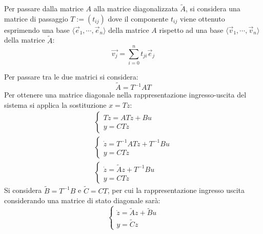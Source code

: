 \documentclass{article}
\numberwithin{equation}{subsection}
\begin{document}
Per passare dalla matrice $A$ alla matrice diagonalizzata $\tilde A$, si considera una matrice di passaggio $T:=(t_{ij})$ dove il componente $t_{ij}$ viene ottenuto esprimendo 
una base $\langle\vec{e}_1,\cdots,\vec{e}_n\rangle$ della matrice $A$ rispetto ad una base $\langle\vec{v}_1,\cdots,\vec{v}_n\rangle$ della matrice $\tilde A$:
\begin{equation}
    \vec{v_j}=\displaystyle\sum_{i=0}^{n}t_{ji}\vec{e}_j
\end{equation}

Per passare tra le due matrici si considera:
\begin{equation}
    \tilde A=T^{-1}AT
\end{equation}
Per ottenere una matrice diagonale nella rappresentazione ingresso-uscita del sistema si applica la sostituzione $x=Tz$:
\begin{gather}
    \begin{cases}
        T\dot z=ATz+Bu\\
        y=CTz
    \end{cases}\\
    \begin{cases}
        \dot z=T^{-1}ATz+T^{-1}Bu\\
        y=CTz
    \end{cases}\\
    \begin{cases}
        \dot z=\tilde Az+T^{-1}Bu\\
        y=CTz
    \end{cases}
\end{gather}
Si considera $\tilde B=T^{-1}B$ e $\tilde C=CT$, per cui la rappresentazione ingresso uscita considerando una matrice di stato diagonale sarà:
\begin{equation}
    \begin{cases}
        \dot z=\tilde Az+\tilde Bu\\
        y=\tilde Cz
    \end{cases}
\end{equation}
\end{document}
